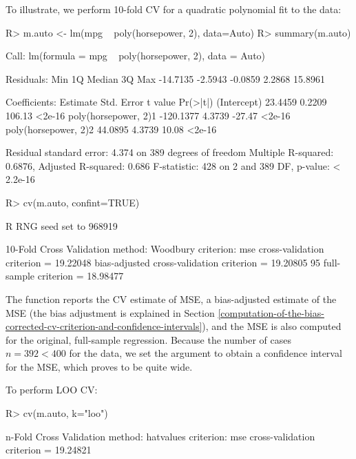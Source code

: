 \documentclass[
]{jss}
\begin{document}
To illustrate, we perform 10-fold CV for a quadratic polynomial fit to
the  data:

\begin{CodeChunk}
\begin{CodeInput}
R> m.auto <- lm(mpg ~ poly(horsepower, 2), data=Auto)
R> summary(m.auto)
\end{CodeInput}
\begin{CodeOutput}

Call:
lm(formula = mpg ~ poly(horsepower, 2), data = Auto)

Residuals:
     Min       1Q   Median       3Q      Max 
-14.7135  -2.5943  -0.0859   2.2868  15.8961 

Coefficients:
                      Estimate Std. Error t value Pr(>|t|)
(Intercept)            23.4459     0.2209  106.13   <2e-16
poly(horsepower, 2)1 -120.1377     4.3739  -27.47   <2e-16
poly(horsepower, 2)2   44.0895     4.3739   10.08   <2e-16

Residual standard error: 4.374 on 389 degrees of freedom
Multiple R-squared:  0.6876,    Adjusted R-squared:  0.686 
F-statistic:   428 on 2 and 389 DF,  p-value: < 2.2e-16
\end{CodeOutput}
\begin{CodeInput}
R> cv(m.auto, confint=TRUE)
\end{CodeInput}
\begin{CodeOutput}
R RNG seed set to 968919
\end{CodeOutput}
\begin{CodeOutput}
10-Fold Cross Validation
method: Woodbury
criterion: mse
cross-validation criterion = 19.22048
bias-adjusted cross-validation criterion = 19.20805
95%
full-sample criterion = 18.98477 
\end{CodeOutput}
\end{CodeChunk}

The function reports the CV estimate of MSE, a bias-adjusted estimate of
the MSE (the bias adjustment is explained in Section
\ref{computation-of-the-bias-corrected-cv-criterion-and-confidence-intervals}),
and the MSE is also computed for the original, full-sample regression.
Because the number of cases \(n = 392 < 400\) for the  data,
we set the argument  to obtain a confidence interval
for the MSE, which proves to be quite wide.

To perform LOO CV:

\begin{CodeChunk}
\begin{CodeInput}
R> cv(m.auto, k="loo")
\end{CodeInput}
\begin{CodeOutput}
n-Fold Cross Validation
method: hatvalues
criterion: mse
cross-validation criterion = 19.24821
\end{CodeOutput}
\end{CodeChunk}
\end{document}
